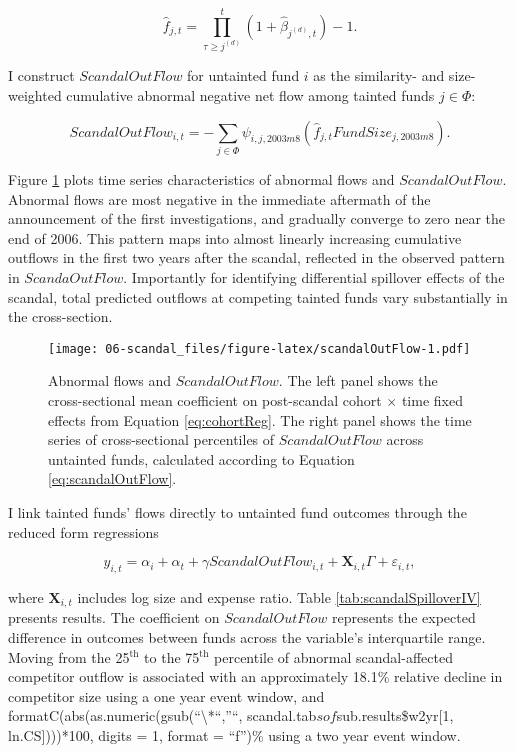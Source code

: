 \documentclass[openany]{book}
\theoremstyle{definition}
\theoremstyle{definition}
\theoremstyle{definition}
\theoremstyle{remark}
\begin{document}
\begin{equation}
\hat{f}_{j,t} = \prod_{\tau\geq j^{(d)}}^t \left(1+\hat{\beta}_{j^{(d)},t}\right) - 1.
\end{equation}

I construct \(ScandalOutFlow\) for untainted fund \(i\) as the
similarity- and size-weighted cumulative abnormal negative net flow
among tainted funds \(j\in\Phi\):

\begin{equation}
ScandalOutFlow_{i,t}= -\sum_{j\in \Phi} \psi_{i,j,2003m8} \left(\hat{f}_{j,t} FundSize_{j,2003m8} \right).
\label{eq:scandalOutFlow}
\end{equation}

Figure \ref{fig:scandalOutFlow} plots time series characteristics of
abnormal flows and \(ScandalOutFlow\). Abnormal flows are most negative
in the immediate aftermath of the announcement of the first
investigations, and gradually converge to zero near the end of 2006.
This pattern maps into almost linearly increasing cumulative outflows in
the first two years after the scandal, reflected in the observed pattern
in \(ScandaOutFlow\). Importantly for identifying differential spillover
effects of the scandal, total predicted outflows at competing tainted
funds vary substantially in the cross-section.

\begin{figure}
\centering
\texttt{[image: 06-scandal\_files/figure-latex/scandalOutFlow-1.pdf]}
\caption{\label{fig:scandalOutFlow}Abnormal flows and \(ScandalOutFlow\).
The left panel shows the cross-sectional mean coefficient on
post-scandal cohort \(\times\) time fixed effects from Equation
\eqref{eq:cohortReg}. The right panel shows the time series of
cross-sectional percentiles of \(ScandalOutFlow\) across untainted
funds, calculated according to Equation \eqref{eq:scandalOutFlow}.}
\end{figure}

I link tainted funds' flows directly to untainted fund outcomes through
the reduced form regressions

\begin{equation}
    y_{i,t}=\alpha_i+\alpha_t+\gamma ScandalOutFlow_{i,t} + \mathbf{X}_{i,t}\Gamma + \varepsilon_{i,t},
\end{equation}

where \(\mathbf{X}_{i,t}\) includes log size and expense ratio. Table
\ref{tab:scandalSpilloverIV} presents results. The coefficient on
\(ScandalOutFlow\) represents the expected difference in outcomes
between funds across the variable's interquartile range. Moving from the
25\(^{\text{th}}\) to the 75\(^{\text{th}}\) percentile of abnormal
scandal-affected competitor outflow is associated with an approximately
18.1\% relative decline in competitor size using a one year event
window, and formatC(abs(as.numeric(gsub(``\textbackslash{}*``,''``,
scandal.tab\(sof\)sub.results\$w2yr{[}1, ln.CS{]})))*100, digits = 1,
format = ``f'')\% using a two year event window.
\end{document}
